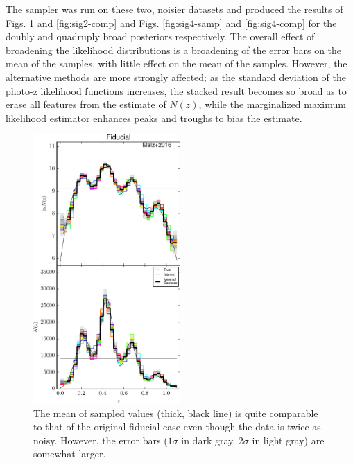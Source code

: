 \documentclass[preprint]{aastex}
\begin{document}
The sampler was run on these two, noisier datasets and produced the results of 
Figs. \ref{fig:sig2-samp} and \ref{fig:sig2-comp} and Figs. \ref{fig:sig4-samp} 
and \ref{fig:sig4-comp} for the doubly and quadruply broad posteriors 
respectively.  The overall effect of broadening the likelihood distributions is 
a broadening of the error bars on the mean of the samples, with little effect 
on the mean of the samples.  However, the alternative methods are more strongly 
affected; as the standard deviation of the photo-z likelihood functions 
increases, the stacked result becomes so broad as to erase all features from 
the estimate of $N(z)$, while the marginalized maximum likelihood estimator 
enhances peaks and troughs to bias the estimate.

\begin{figure}
\includegraphics[width=0.5\textwidth]{figs/sig2/samps.pdf}
\caption{The mean of sampled values (thick, black line) is quite comparable to 
that of the original fiducial case even though the data is twice as noisy.  
However, the error bars ($1\sigma$ in dark gray, $2\sigma$ in light gray) are 
somewhat larger.}
\label{fig:sig2-samp}
\end{figure}
\end{document}
